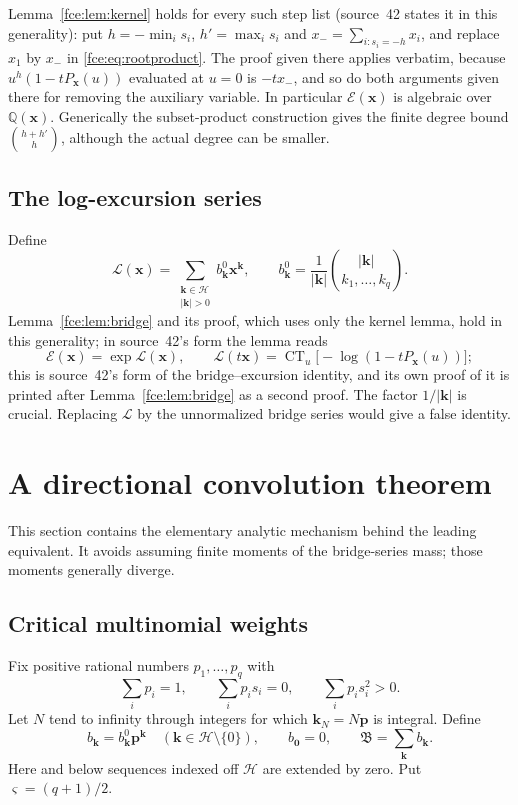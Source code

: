 \documentclass[11pt,a4paper]{article}
\numberwithin{equation}{section}
\theoremstyle{definition}\newtheorem{definition}[theorem]{Definition}
\theoremstyle{remark}\newtheorem{remark}[theorem]{Remark}
\newcommand{\Q}{\mathbb Q}
\newcommand{\ct}{\operatorname{CT}}
\newcommand{\E}{\mathcal E}
\newcommand{\Lcal}{\mathcal L}
\newcommand{\Bmass}{\mathfrak B}
\begin{document}
Lemma~\ref{fce:lem:kernel} holds for every such step list (source~42
states it in this generality): put $h=-\min_i s_i$, $h'=\max_i s_i$ and
$x_-=\sum_{i:s_i=-h}x_i$, and replace $x_1$ by $x_-$ in
\eqref{fce:eq:rootproduct}. The proof given there applies verbatim,
because $u^h(1-tP_{\boldsymbol x}(u))$ evaluated at $u=0$ is $-tx_-$, and so
do both arguments given there for removing the auxiliary variable. In
particular $\E(\boldsymbol x)$ is algebraic over $\Q(\boldsymbol x)$.
Generically the subset-product construction gives the finite degree bound
$\binom{h+h'}{h}$, although the actual degree can be smaller.

\subsection{The log-excursion series}
Define
\begin{equation}\label{fce:lg:eq:Bformal}
 \Lcal(\boldsymbol x)=\sum_{\substack{\boldsymbol k\in\mathcal H\\|\boldsymbol k|>0}}
 b^0_{\boldsymbol k}\boldsymbol x^{\boldsymbol k},\qquad
 b^0_{\boldsymbol k}=\frac1{|\boldsymbol k|}\binom{|\boldsymbol k|}{k_1,\ldots,k_q}.
\end{equation}
Lemma~\ref{fce:lem:bridge} and its proof, which uses only the kernel
lemma, hold in this generality; in source~42's form the lemma reads
\begin{equation}\label{fce:lg:eq:exp}
 \E(\boldsymbol x)=\exp\Lcal(\boldsymbol x),\qquad
 \Lcal(t\boldsymbol x)=\ct_u\bigl[-\log(1-tP_{\boldsymbol x}(u))\bigr];
\end{equation}
this is source~42's form of the bridge--excursion identity, and its own
proof of it is printed after Lemma~\ref{fce:lem:bridge} as a second proof.
The factor $1/|\boldsymbol k|$ is crucial. Replacing $\Lcal$ by the
unnormalized bridge series would give a false identity.

\section{A directional convolution theorem}\label{fce:lg:sec:convolution}
This section contains the elementary analytic mechanism behind the leading
equivalent. It avoids assuming finite moments of the bridge-series mass;
those moments generally diverge.

\subsection{Critical multinomial weights}
Fix positive rational numbers $p_1,\ldots,p_q$ with
\begin{equation}\label{fce:lg:eq:p}
 \sum_i p_i=1,\qquad \sum_i p_i s_i=0,
 \qquad \sum_i p_i s_i^2>0.
\end{equation}
Let $N$ tend to infinity through integers for which
$\boldsymbol k_N=N\boldsymbol p$ is integral. Define
\[
 b_{\boldsymbol k}=b^0_{\boldsymbol k}\boldsymbol p^{\boldsymbol k}
 \quad(\boldsymbol k\in\mathcal H\setminus\{0\}),
 \qquad b_{\boldsymbol0}=0,
 \qquad \Bmass=\sum_{\boldsymbol k}b_{\boldsymbol k}.
\]
Here and below sequences indexed off $\mathcal H$ are extended by zero.
Put $\varsigma=(q+1)/2$.
\end{document}
